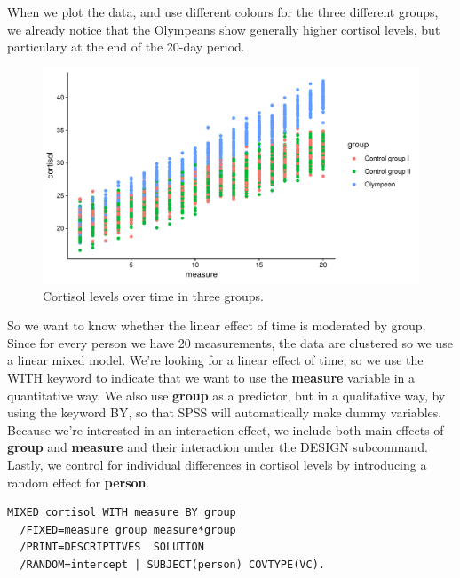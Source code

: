 \documentclass[]{book}\usepackage[]{graphicx}\usepackage[]{color}
\makeatletter
\def\maxwidth{ %
  \ifdim\Gin@nat@width>\linewidth
    \linewidth
  \else
    \Gin@nat@width
  \fi
}
\newenvironment{knitrout}{}{} %
\makeatother
\begin{document}
When we plot the data, and use different colours for the three different groups, we already notice that the Olympeans show generally higher cortisol levels, but particulary at the end of the 20-day period.



\begin{knitrout}
\color{fgcolor}\begin{figure}

{\centering \includegraphics[width=\maxwidth]{figure/analysismixed20_2-1} 

}

\caption[Cortisol levels over time in three groups]{Cortisol levels over time in three groups.}\label{fig:analysismixed20_2}
\end{figure}


\end{knitrout}

So we want to know whether the linear effect of time is moderated by group. Since for every person we have 20 measurements, the data are clustered so we use a linear mixed model. We're looking for a linear effect of time, so we use the WITH keyword to indicate that we want to use the \textbf{measure} variable in a quantitative way. We also use \textbf{group} as a predictor, but in a qualitative way, by using the keyword BY, so that SPSS will automatically make dummy variables. Because we're interested in an interaction effect, we include both main effects of \textbf{group} and \textbf{measure} and their interaction under the DESIGN subcommand. Lastly, we control for individual differences in cortisol levels by introducing a random effect for \textbf{person}.


\begin{verbatim}
MIXED cortisol WITH measure BY group 
  /FIXED=measure group measure*group
  /PRINT=DESCRIPTIVES  SOLUTION
  /RANDOM=intercept | SUBJECT(person) COVTYPE(VC).
\end{verbatim}
\end{document}
